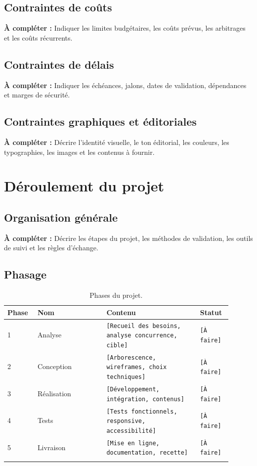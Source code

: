 \documentclass[11pt,a4paper]{report}
\newcommand{\placeholder}[1]{\textcolor{placeholderColor}{\texttt{[#1]}}}
\newcommand{\todo}[1]{\textcolor{todoColor}{\textbf{À compléter :} #1}}
\newcommand{\blankspace}[1]{\vspace*{#1}}
\begin{document}
\section{Contraintes de coûts}
\todo{Indiquer les limites budgétaires, les coûts prévus, les arbitrages et les coûts récurrents.}
\blankspace{6cm}

\section{Contraintes de délais}
\todo{Indiquer les échéances, jalons, dates de validation, dépendances et marges de sécurité.}
\blankspace{6cm}

\section{Contraintes graphiques et éditoriales}
\todo{Décrire l'identité visuelle, le ton éditorial, les couleurs, les typographies, les images et les contenus à fournir.}
\blankspace{6cm}

\chapter{Déroulement du projet}

\section{Organisation générale}
\todo{Décrire les étapes du projet, les méthodes de validation, les outils de suivi et les règles d'échange.}
\blankspace{7cm}

\section{Phasage}
\begin{longtable}{p{0.12\linewidth}p{0.28\linewidth}p{0.38\linewidth}p{0.12\linewidth}}
\toprule
\textbf{Phase} & \textbf{Nom} & \textbf{Contenu} & \textbf{Statut} \\
\midrule
\endhead
1 & Analyse & \placeholder{Recueil des besoins, analyse concurrence, cible} & \placeholder{À faire} \\
2 & Conception & \placeholder{Arborescence, wireframes, choix techniques} & \placeholder{À faire} \\
3 & Réalisation & \placeholder{Développement, intégration, contenus} & \placeholder{À faire} \\
4 & Tests & \placeholder{Tests fonctionnels, responsive, accessibilité} & \placeholder{À faire} \\
5 & Livraison & \placeholder{Mise en ligne, documentation, recette} & \placeholder{À faire} \\
\bottomrule
\caption{Phases du projet.}
\label{tab:phasage}
\end{longtable}
\end{document}

